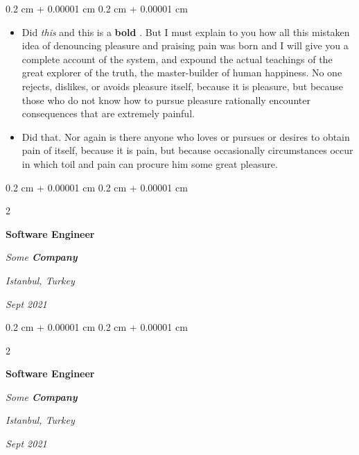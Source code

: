\documentclass[10pt, letterpaper]{article}
\newenvironment{highlights}{
    \begin{itemize}[
        topsep=0.10 cm,
        parsep=0.10 cm,
        partopsep=0pt,
        itemsep=0pt,
        leftmargin=0.4 cm + 10pt
    ]
}{
    \end{itemize}
} %
\newenvironment{onecolentry}{
    \begin{adjustwidth}{
        0.2 cm + 0.00001 cm
    }{
        0.2 cm + 0.00001 cm
    }
}{
    \end{adjustwidth}
} %
\newenvironment{twocolentry}[2][]{
    \onecolentry
    \def\secondColumn{#2}
    \setcolumnwidth{\fill, 4.5 cm}
    \begin{paracol}{2}
}{
    \switchcolumn \raggedleft \secondColumn
    \end{paracol}
    \endonecolentry
} %
\let\hrefWithoutArrow\href
\renewcommand{\href}[2]{\hrefWithoutArrow{#1}{\ifthenelse{\equal{#2}{}}{ }{#2 }\raisebox{.15ex}{\footnotesize \faExternalLink*}}}
\begin{document}
        \vspace{0.10 cm}
        \begin{onecolentry}
            \begin{highlights}
                \item Did \textit{this} and this is a \textbf{bold} \href{https://example.com}{link}. But I must explain to you how all this mistaken idea of denouncing pleasure and praising pain was born and I will give you a complete account of the system, and expound the actual teachings of the great explorer of the truth, the master-builder of human happiness. No one rejects, dislikes, or avoids pleasure itself, because it is pleasure, but because those who do not know how to pursue pleasure rationally encounter consequences that are extremely painful.
                \item Did that. Nor again is there anyone who loves or pursues or desires to obtain pain of itself, because it is pain, but because occasionally circumstances occur in which toil and pain can procure him some great pleasure.
            \end{highlights}
        \end{onecolentry}


        \vspace{0.2 cm}

            \begin{twocolentry}{
        \textit{Istanbul, Turkey}

        \textit{Sept 2021}    }
                \textbf{Software Engineer}

                \textit{Some \textbf{Company}}
            \end{twocolentry}



        \vspace{0.2 cm}

            \begin{twocolentry}{
        \textit{Istanbul, Turkey}

        \textit{Sept 2021}    }
                \textbf{Software Engineer}

                \textit{Some \textbf{Company}}
            \end{twocolentry}
\end{document}
